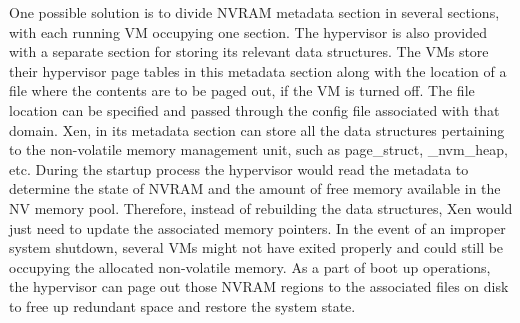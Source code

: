 One possible solution is to divide NVRAM metadata section in several sections, with each running VM occupying one section. The hypervisor is also provided with a separate section for storing its relevant data structures. The VMs store their hypervisor page tables in this metadata section along with the location of a file where the contents are to be paged out, if the VM is turned off. The file location can be specified and passed through the config file associated with that domain. Xen, in its metadata section can store all the data structures pertaining to the non-volatile memory management unit, such as page\_struct, \_nvm\_heap, etc. During the startup process the hypervisor would read the metadata to determine the state of NVRAM and the amount of free memory available in the NV memory pool. Therefore, instead of rebuilding the data structures, Xen would just need to update the associated memory pointers. In the event of an improper system shutdown, several VMs might not have exited properly and could still be occupying the allocated non-volatile memory. As a part of boot up operations, the hypervisor can page out those NVRAM regions to the associated files on disk to free up redundant space and restore the system state.
